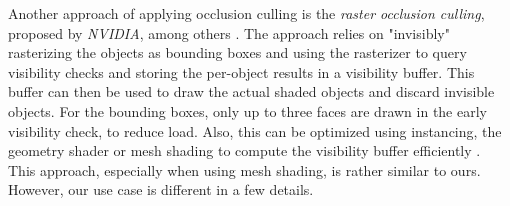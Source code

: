 Another approach of applying occlusion culling is the \emph{raster occlusion culling}, proposed by \emph{NVIDIA}, among 
others \cite{NVIDIAGLOC2016}. The approach relies on "invisibly" rasterizing the objects as bounding boxes and using the 
rasterizer to query visibility checks and storing the per-object results in a visibility buffer. This buffer can then be 
used to draw the actual shaded objects and discard invisible objects. For the bounding boxes, only up to three faces are 
drawn in the early visibility check, to reduce load. Also, this can be optimized using instancing, the geometry shader or 
mesh shading to compute the visibility buffer efficiently \cite{NVIDIAGLOC2016}. This approach, especially when using 
mesh shading, is rather similar to ours. However, our use case is different in a few details.
